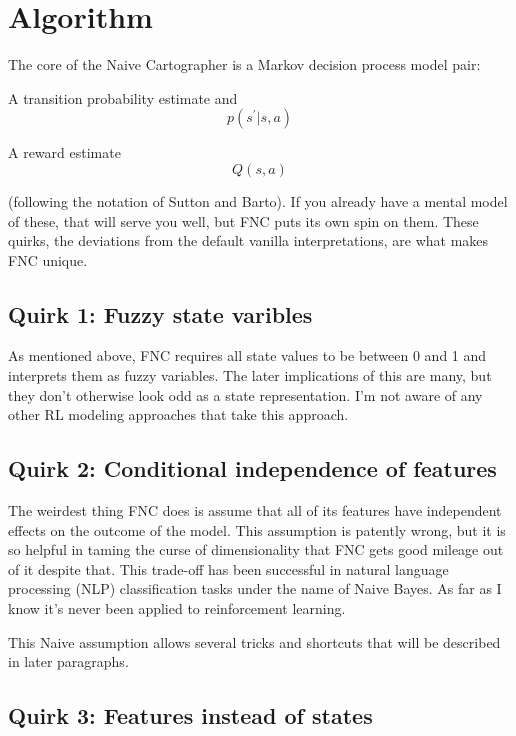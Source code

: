 \section{Algorithm}


The core of the Naive Cartographer is a Markov decision process model pair:

A transition probability estimate and
\begin{equation}
p(s^\prime | s, a)
\end{equation}

A reward estimate
\begin{equation}
Q(s, a)
\end{equation}

(following the notation of Sutton and Barto). If you already have a mental model
of these, that will serve you well, but FNC puts its own spin on them.
These quirks, the deviations from the default vanilla interpretations,
are what makes FNC unique.

\subsection*{Quirk 1: Fuzzy state varibles}
\label{algofuzzy}

As mentioned above, FNC requires
all state values to be between 0 and 1 and interprets them as fuzzy variables.
The later implications of this are many, but they don't otherwise
look odd as a state representation. I'm not aware of any other RL modeling
approaches that take this approach.

\subsection*{Quirk 2: Conditional independence of features}
\label{algobayes}

The weirdest thing FNC does is assume that all of its features have
independent effects on the outcome of the model. This assumption
is patently wrong, but it is so helpful in taming the curse of
dimensionality that FNC gets good mileage out of it despite that.
This trade-off has been successful in natural language processing (NLP)
classification tasks under the name of Naive Bayes. As far as I know it's
never been applied to reinforcement learning.

This Naive assumption allows several tricks and shortcuts that will be
described in later paragraphs.

\subsection*{Quirk 3: Features instead of states}
\label{introstate}

